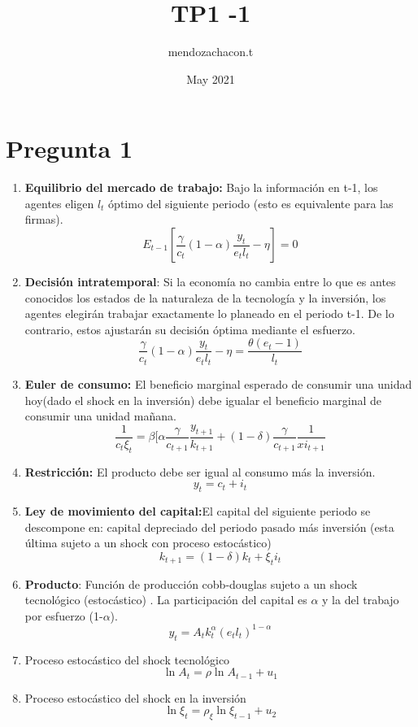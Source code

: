 \documentclass{article}
\title{TP1 -1}
\author{mendozachacon.t }
\date{May 2021}
\begin{document}
\maketitle

\section{Pregunta 1}


 
\begin{enumerate}
		
\item  \textbf{Equilibrio del mercado de trabajo:} Bajo la información en t-1, los agentes eligen $l_t$ óptimo del siguiente periodo (esto es equivalente para las firmas).
$$
	E_{t-1}[\frac {\gamma}{c_t}(1-\alpha)\frac {y_t}{e_t l_t}-\eta]=0
$$

\item \textbf{Decisión intratemporal}:  Si  la economía no cambia entre lo que es antes conocidos los estados de la naturaleza de la tecnología y la inversión, los agentes elegirán trabajar exactamente lo planeado en el periodo t-1. De lo contrario, estos ajustarán su decisión óptima mediante el esfuerzo.
$$
	\frac{\gamma}{c_t}(1-\alpha)\frac{y_t}{e_t l_t}-\eta=\frac{\theta(e_t-1)}{l_t}
 $$

\item \textbf{Euler de consumo:} El beneficio marginal esperado de consumir una unidad hoy(dado el shock en la inversión) debe igualar el beneficio marginal de consumir una unidad mañana.
$$
\frac{1}{c_t\xi_t}=\beta[\alpha\frac{\gamma}{c_{t+1}}\frac{y_{t+1}}{k_{t+1}}+(1-\delta) \frac{\gamma}{c_{t+1}} \frac{1}{xi_{t+1}}
$$


\item \textbf{Restricción:} El producto debe ser igual al consumo más la inversión.
$$
	y_t=c_t+i_t
	$$

\item \textbf{Ley de movimiento del capital:}El capital del siguiente periodo se descompone en: capital depreciado del periodo pasado más inversión (esta última sujeto a un shock con proceso estocástico)
$$
	k_{t+1}=(1-\delta)k_t+\xi_ti_t
$$
\item \textbf{Producto}: Función de producción cobb-douglas sujeto a un shock tecnológico (estocástico) . La participación del capital es $\alpha$ y la del trabajo por esfuerzo (1-$\alpha$).
$$
y_t=A_t k_t^\alpha (e_tl_t)^{1-\alpha}
$$
\item Proceso estocástico del shock tecnológico
$$
\ln A_t=\rho \ln A_{t-1}+u_1
$$
\item Proceso estocástico del shock en la inversión
	$$
	\ln \xi_t=\rho_\xi \ln \xi_{t-1}+u_2
	$$
\end{enumerate}
\end{document}
